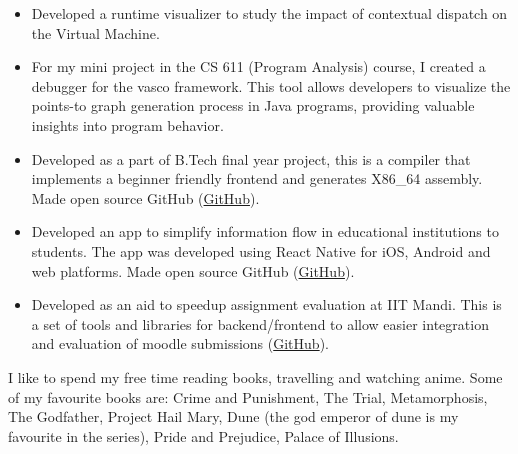 \begin{itemize}
\item Developed a runtime visualizer to study the impact of contextual dispatch on the \rsh{} Virtual Machine.
\end{itemize}

\begin{itemize}
\item For my mini project in the CS 611 (Program Analysis) course, I created a debugger for the vasco framework. This tool allows developers to visualize the points-to graph generation process in Java programs, providing valuable insights into program behavior.
\end{itemize}

\begin{itemize}
\item Developed as a part of B.Tech final year project, this is a compiler that implements a beginner friendly frontend and generates X86\_64 assembly. Made open source GitHub (\href{https://github.com/meetesh06/xope_4.2}{GitHub}).
\end{itemize}
\smallskip
{}
\begin{itemize}
\item Developed an app to simplify information flow in educational institutions to students. The app was developed using React Native for iOS, Android and web platforms. Made open source GitHub (\href{https://github.com/meetesh06/CampusStory}{GitHub}).
\end{itemize}
\smallskip
{}
\begin{itemize}
\item Developed as an aid to speedup assignment evaluation at IIT Mandi. This is a set of tools and libraries for backend/frontend to allow easier integration and evaluation of moodle submissions (\href{https://github.com/CompL-Research/CompL-Evaluator-Backend}{GitHub}).
\end{itemize}
\smallskip


I like to spend my free time reading books, travelling and watching anime.
Some of my favourite books are: Crime and Punishment, The Trial, Metamorphosis, The Godfather, Project Hail Mary, Dune (the god emperor of dune is my favourite in the series), Pride and Prejudice, Palace of Illusions.
